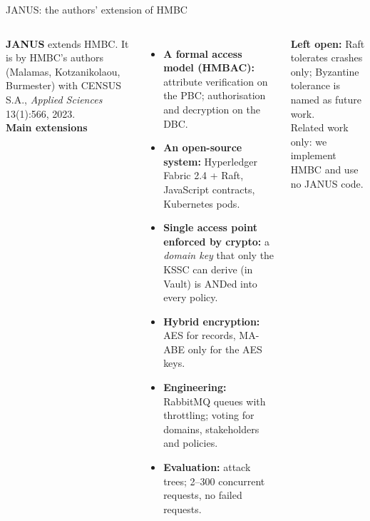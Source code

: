 \documentclass[aspectratio=169,10pt]{beamer}
\begin{document}
\begin{frame}{JANUS: the authors' extension of HMBC}
\begin{columns}[T,onlytextwidth]
\footnotesize
\textbf{JANUS} extends HMBC. It is by HMBC's authors (Malamas, Kotzanikolaou, Burmester) with CENSUS S.A., \emph{Applied Sciences} 13(1):566, 2023.\\[0.4em]
\textbf{Main extensions}
\begin{itemize}\scriptsize\setlength{\itemsep}{2pt}
  \item \textbf{A formal access model (HMBAC):} attribute verification on the PBC; authorisation and decryption on the DBC.
  \item \textbf{An open-source system:} Hyperledger Fabric 2.4 + Raft, JavaScript contracts, Kubernetes pods.
  \item \textbf{Single access point enforced by crypto:} a \emph{domain key} that only the KSSC can derive (in Vault) is ANDed into every policy.
  \item \textbf{Hybrid encryption:} AES for records, MA-ABE only for the AES keys.
  \item \textbf{Engineering:} RabbitMQ queues with throttling; voting for domains, stakeholders and policies.
  \item \textbf{Evaluation:} attack trees; 2--300 concurrent requests, no failed requests.
\end{itemize}
\vspace{0.3em}
\scriptsize\textbf{\textcolor{accent}{Left open:}} Raft tolerates crashes only; Byzantine tolerance is named as future work.\\[0.3em]
{\color{datagray}Related work only: we implement HMBC and use no JANUS code.}
\end{columns}
\end{frame}
\end{document}
